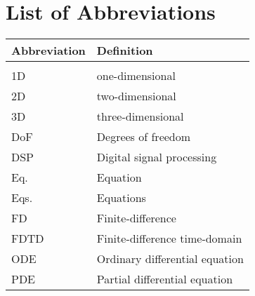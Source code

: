 \chapter{List of Abbreviations}
{\centering\renewcommand{\arraystretch}{1.1}
\begin{longtable}{ p{3cm} p{8cm}}
 Abbreviation & Definition\\
 \hline\\
 \endhead
 1D & one-dimensional\\
 2D & two-dimensional \\
 3D & three-dimensional \\
 DoF & Degrees of freedom \\
 DSP & Digital signal processing \\
 Eq. & Equation \\
 Eqs. & Equations\\
 FD & Finite-difference\\
 FDTD & Finite-difference time-domain\\
 ODE & Ordinary differential equation\\
 PDE & Partial differential equation
\end{longtable}}